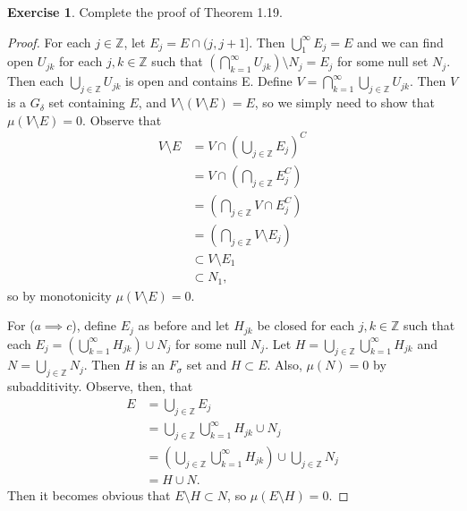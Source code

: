 \documentclass{article}
\theoremstyle{definition}
\newtheorem{ex}{Exercise}
\begin{document}
\begin{ex}
	Complete the proof of Theorem 1.19.
\end{ex}
\begin{proof}
	For each $j \in \mathbb{Z}$, let $E_j = E \cap (j, j+ 1]$.
	Then $\bigcup_1^\infty E_j = E$ and we can find open $U_{jk}$ for each $j, k \in \mathbb{Z}$ such that $\left( \bigcap_{k = 1}^\infty U_{jk} \right) \setminus N_j = E_j$ for some null set $N_j$.
	Then each $\bigcup_{j \in \mathbb{Z}}U_{jk}$ is open and contains E.
	Define $V = \bigcap_{k = 1}^\infty \bigcup_{j \in \mathbb{Z}} U_{jk}$.
	Then $V$ is a $G_\delta$ set containing $E$, and $V \setminus (V \setminus E) = E$, so we simply need to show that $\mu(V \setminus E) = 0$.
	Observe that \begin{align*}
		V \setminus E & = V \cap \left( \bigcup_{j \in \mathbb{Z}} E_j \right)^C    \\
		              & = V \cap \left( \bigcap_{j \in \mathbb{Z}} E_j^C \right)    \\
		              & = \left( \bigcap_{j \in \mathbb{Z}} V \cap E_j^C \right)    \\
		              & = \left( \bigcap_{j \in \mathbb{Z}} V \setminus E_j \right) \\
		              & \subset V \setminus E_1                                     \\
		              & \subset N_1,
	\end{align*}
	so by monotonicity $\mu(V \setminus E) = 0$.

	For ($a \implies c$), define $E_j$ as before and let $H_{jk}$ be closed for each $j, k \in \mathbb{Z}$ such that each $E_j = \left( \bigcup_{k = 1}^\infty H_{jk} \right) \cup N_j$ for some null $N_j$.
	Let $H = \bigcup_{j \in \mathbb{Z}} \bigcup_{k = 1}^\infty H_{jk}$ and $N = \bigcup_{j \in \mathbb{Z}} N_j$.
	Then $H$ is an $F_\sigma$ set and $H \subset E$.
	Also, $\mu(N) = 0$ by subadditivity.
	Observe, then, that \begin{align*}
		E & = \bigcup_{j \in \mathbb{Z}} E_j                                                                              \\
		  & = \bigcup_{j \in \mathbb{Z}} \bigcup_{k = 1}^\infty H_{jk} \cup N_j                                           \\
		  & = \left( \bigcup_{j \in \mathbb{Z}} \bigcup_{k = 1}^\infty H_{jk} \right) \cup \bigcup_{j \in \mathbb{Z}} N_j \\
		  & = H \cup N.
	\end{align*}
	Then it becomes obvious that $E \setminus H \subset N$, so $\mu(E \setminus H) = 0$.
\end{proof}
\end{document}

